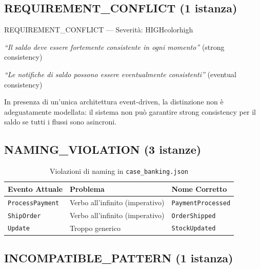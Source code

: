 \documentclass[12pt,a4paper]{report}
\begin{document}
\subsection{REQUIREMENT\_CONFLICT (1 istanza)}

\begin{issuebox}{REQUIREMENT\_CONFLICT --- Severità: HIGH}{colorhigh}
\begin{description}[leftmargin=3.5cm, labelwidth=3.3cm]
  \item[FR-ACC-001] \textit{``Il saldo deve essere fortemente consistente in ogni momento''} (strong consistency)
  \item[FR-ACC-002] \textit{``Le notifiche di saldo possono essere eventualmente consistenti''} (eventual consistency)
  \item[Conflitto]  In presenza di un'unica architettura event-driven, la distinzione non è
                   adeguatamente modellata: il sistema non può garantire strong consistency
                   per il saldo se tutti i flussi sono asincroni.
\end{description}
\end{issuebox}

\subsection{NAMING\_VIOLATION (3 istanze)}

\begin{table}[H]
\centering
\renewcommand{\arraystretch}{1.4}
\begin{tabularx}{\textwidth}{l X l}
\toprule
\textbf{Evento Attuale} & \textbf{Problema} & \textbf{Nome Corretto} \\
\midrule
\texttt{ProcessPayment} & Verbo all'infinito (imperativo) & \texttt{PaymentProcessed} \\
\texttt{ShipOrder}      & Verbo all'infinito (imperativo) & \texttt{OrderShipped} \\
\texttt{Update}         & Troppo generico                 & \texttt{StockUpdated} \\
\bottomrule
\end{tabularx}
\caption{Violazioni di naming in \texttt{case\_banking.json}}
\label{tab:bank-naming}
\end{table}

\subsection{INCOMPATIBLE\_PATTERN (1 istanza)}
\end{document}
